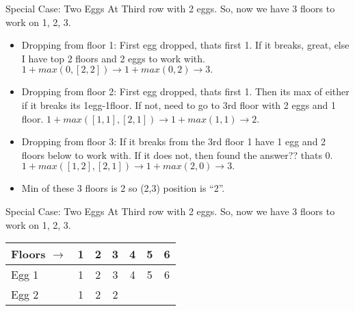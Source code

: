    \begin{frame}[fragile]{Special Case: Two Eggs}
At Third row with 2 eggs. So, now we have 3 floors to work on 1, 2, 3.
\begin{itemize}
\item Dropping from floor 1: First egg dropped, thats first 1. If it breaks, great, else I have top 2 floors and 2 eggs to work with. $ 1 + max (0,[2,2]) \rightarrow 1 + max (0,2) \rightarrow 3.$
\item Dropping from floor 2: First egg dropped, thats first 1. Then its max of either if it breaks its 1egg-1floor. If not, need to go to 3rd floor with 2 eggs and 1 floor. $ 1 + max ([1,1],[2,1]) \rightarrow 1 + max (1,1) \rightarrow 2$.
\item Dropping from floor 3: If it breaks from the 3rd floor 1 have 1 egg and 2 floors below to work with. If it does not, then found the answer?? thats 0. $ 1 + max ([1,2],[2,1]) \rightarrow 1 + max (2,0) \rightarrow 3.$
\item Min of these 3 floors is 2 so (2,3) position is ``2''.
\end{itemize}

\end{frame}


   \begin{frame}[fragile]{Special Case: Two Eggs}
At Third row with 2 eggs. So, now we have 3 floors to work on 1, 2, 3.
 \begin{center}
 \begin{tabular}{|l|c|c|c|c|c|c|}
 \hline
Floors $\rightarrow$ & 1 &  2 &   3 &   4 & 5 &  6\\  \hline
Egg 1 & 1 & 2 & 3 & 4 & 5 & 6\\
Egg 2 & 1 & 2 & 2\\
 \hline
 \end{tabular}
 \end{center}

\end{frame}


